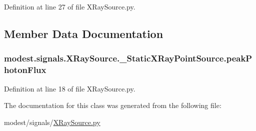 Definition at line 27 of file X\+Ray\+Source.\+py.



\subsection{Member Data Documentation}
\subsubsection[{\texorpdfstring{peak\+Photon\+Flux}{peakPhotonFlux}}]{\setlength{\rightskip}{0pt plus 5cm}modest.\+signals.\+X\+Ray\+Source.\+\_\+\+Static\+X\+Ray\+Point\+Source.\+peak\+Photon\+Flux}\hypertarget{classmodest_1_1signals_1_1XRaySource_1_1__StaticXRayPointSource_a6e166745b77cf688aaeb474642bf3736}{}\label{classmodest_1_1signals_1_1XRaySource_1_1__StaticXRayPointSource_a6e166745b77cf688aaeb474642bf3736}


Definition at line 18 of file X\+Ray\+Source.\+py.



The documentation for this class was generated from the following file\+:\begin{DoxyCompactItemize}
\item 
modest/signals/\hyperlink{XRaySource_8py}{X\+Ray\+Source.\+py}\end{DoxyCompactItemize}
